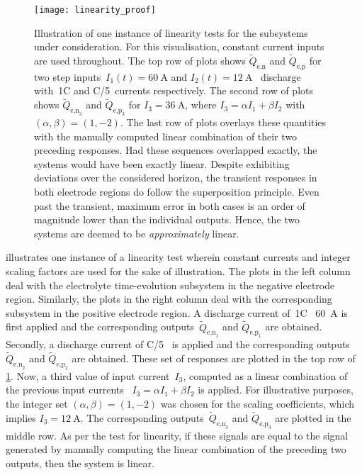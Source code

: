 \begin{figure}[!htbp]
    \centering
    \texttt{[image: linearity\_proof]}
    \caption[Illustration of linearity test for the
     and
     subsystems]{Illustration of one
        instance of linearity tests for the subsystems under consideration. For
        this visualisation, constant current inputs are used throughout. The top
        row of plots shows $\widetilde{Q}_{\text{e,n}}$ and
        $\widetilde{Q}_{\text{e,p}}$ for two step inputs~${I_1(t) =
        \SI{60}{\ampere}}$ and $I_2(t) = \SI{12}{\ampere}$ \ie~discharge with~1C and C/5~currents respectively. The second row of plots shows
        $\widetilde{Q}_{\text{e,n}_3}$ and $\widetilde{Q}_{\text{e,p}_3}$  for
        ${I_3 = \SI{36}{\ampere}}$, where $I_3 = \alpha I_1 + \beta I_2$ with~${(\alpha,\beta) = (1,-2)}$. The last row of plots overlays these
        quantities with the manually computed linear combination of their two
        preceding responses. Had these sequences overlapped exactly, the systems
        would have been exactly linear. Despite exhibiting deviations over the
        considered horizon, the transient responses in both electrode regions do
        follow the superposition principle. Even past the transient, maximum
        error in both cases is an order of magnitude lower than the individual
        outputs. Hence, the two systems are deemed to be \emph{approximately}
        linear.
    }%
    \label{fig:linearity}
\end{figure}

  illustrates  one  instance  of a  linearity  test  wherein
constant  currents  and  integer  scaling  factors are  used  for  the  sake  of
illustration.  The  plots   in  the  left  column  deal   with  the  electrolyte
time-evolution  subsystem  in  the  negative electrode  region.  Similarly,  the
plots  in  the  right  column  deal with  the  corresponding  subsystem  in  the
positive electrode region.  A discharge current of~1C  \ie~\SI{60}{\ampere} is
first  applied  and  the  corresponding  outputs~$\widetilde{Q}_{\text{e,n}_1}$
and   $\widetilde{Q}_{\text{e,p}_1}$  are   obtained.   Secondly,  a   discharge
current   of   C/5   \ie~is    applied   and   the   corresponding   outputs~$\widetilde{Q}_{\text{e,n}_2}$ and  $\widetilde{Q}_{\text{e,p}_2}$ are obtained.
These set of responses are plotted  in the top row of \cref{fig:linearity}. Now,
a  third  value  of  input  current~$I_3$,  computed  as  a  linear  combination
of  the  previous  input  currents  \ie~${I_3 =  \alpha  I_1  +  \beta  I_2  }$
is  applied.  For  illustrative  purposes, the  integer  set  ${(\alpha,\beta)  =
    (1,-2)}$  was  chosen  for  the   scaling  coefficients,  which  implies  ${I_3  =
\SI{12}{\ampere}}$. The corresponding  outputs~$\widetilde{Q}_{\text{e,n}_3}$ and
$\widetilde{Q}_{\text{e,p}_3}$ are  plotted in the  middle row. As per  the test
for linearity,  if these signals are  equal to the signal  generated by manually
computing the linear  combination of the preceding two outputs,  then the system
is linear.

